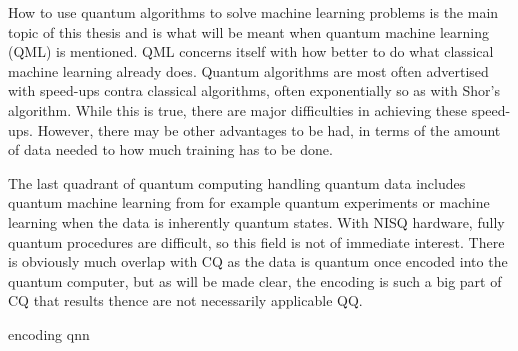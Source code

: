 How to use quantum algorithms to solve machine learning problems is the main topic of this thesis and is what will be meant when quantum machine learning (QML) is mentioned.
QML concerns itself with how better to do what classical machine learning already does.
Quantum algorithms are most often advertised with speed-ups contra classical algorithms, often exponentially so as with Shor's algorithm.
While this is true, there are major difficulties in achieving these speed-ups.
However, there may be other advantages to be had, in terms of the amount of data needed to how much training has to be done.

The last quadrant of quantum computing handling quantum data includes quantum machine learning from for example quantum experiments or machine learning when the data is inherently quantum states.
With NISQ hardware, fully quantum procedures are difficult, so this field is not of immediate interest.
There is obviously much overlap with CQ as the data is quantum once encoded into the quantum computer, but as will be made clear, the encoding is such a big part of CQ that results thence are not necessarily applicable QQ.


{encoding}
{qnn}
